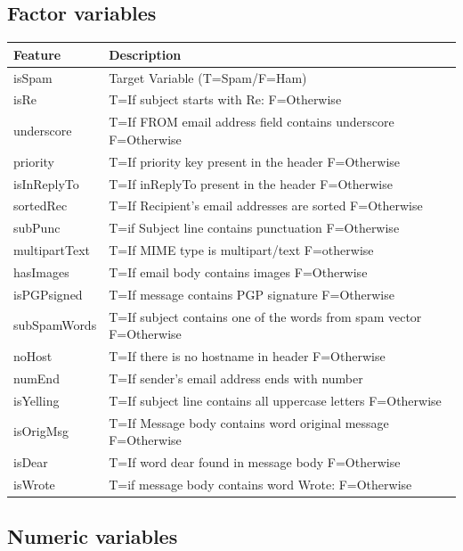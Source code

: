 \documentclass[
]{article}
\begin{document}
\hypertarget{factor-variables}{%
\subsection{Factor variables}\label{factor-variables}}

\begin{table}[H]
\centering
\begin{tabular}[t]{l>{\raggedright\arraybackslash}p{30em}}
\toprule
Feature & Description\\
\midrule
isSpam & Target Variable (T=Spam/F=Ham)\\
isRe & T=If subject starts with Re: F=Otherwise\\
underscore & T=If FROM email address field contains underscore F=Otherwise\\
priority & T=If priority key present in the header F=Otherwise\\
isInReplyTo & T=If inReplyTo present in the header F=Otherwise\\
\addlinespace
sortedRec & T=If Recipient's email addresses are sorted F=Otherwise\\
subPunc & T=if Subject line contains punctuation F=Otherwise\\
multipartText & T=If MIME type is multipart/text F=otherwise\\
hasImages & T=If email body contains images F=Otherwise\\
isPGPsigned & T=If message contains PGP signature F=Otherwise\\
\addlinespace
subSpamWords & T=If subject contains one of the words from spam vector F=Otherwise\\
noHost & T=If there is no hostname in header F=Otherwise\\
numEnd & T=If sender's email address ends with number\\
isYelling & T=If subject line contains all uppercase letters F=Otherwise\\
isOrigMsg & T=If Message body contains word original message F=Otherwise\\
\addlinespace
isDear & T=If word dear found in message body F=Otherwise\\
isWrote & T=if message body contains word Wrote: F=Otherwise\\
\bottomrule
\end{tabular}
\end{table}

\hypertarget{numeric-variables}{%
\subsection{Numeric variables}\label{numeric-variables}}
\end{document}
